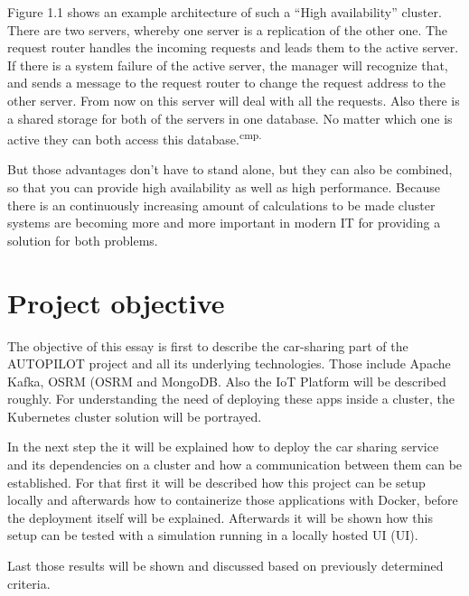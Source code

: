 Figure 1.1 shows an example architecture of such a ``High availability'' cluster. There are two servers, whereby one server is a replication of the other one. The request router handles the incoming requests and leads them to the active server. If there is a system failure of the active server, the manager will recognize that, and sends a message to the request router to change the request address to the other server. From now on this server will deal with all the requests. Also there is a shared storage for both of the servers in one database. No matter which one is active they can both access this database.\textsuperscript{cmp.\cite{9}}


But those advantages don't have to stand alone, but they can also be combined, so that you can provide high availability as well as high performance. Because there is an continuously increasing amount of calculations to be made cluster systems are becoming more and more important in modern IT for providing a solution for both problems.

\section{Project objective}

The objective of this essay is first to describe the car-sharing part of the AUTOPILOT project and all its underlying technologies. Those include Apache Kafka, \acs{OSRM} (\acl{OSRM} and MongoDB. Also the IoT Platform will be described roughly. For understanding the need of deploying these apps inside a cluster, the Kubernetes cluster solution will be portrayed.

In the next step the it will be explained how to deploy the car sharing service and its dependencies on a cluster and how a communication between them can be established. For that first it will be described how this project can be setup locally and afterwards how to containerize those applications with Docker, before the deployment itself will be explained. Afterwards it will be shown how this setup can be tested with a simulation running in a locally hosted \acs{UI} (\acl{UI}).

Last those results will be shown and discussed based on previously determined criteria. 


